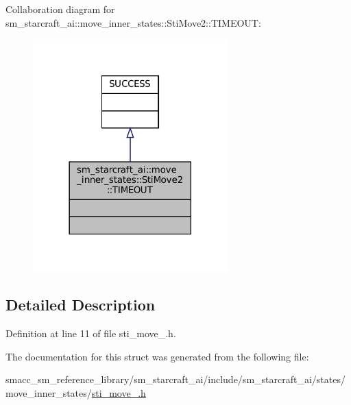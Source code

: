 Collaboration diagram for sm\+\_\+starcraft\+\_\+ai\+:\+:move\+\_\+inner\+\_\+states\+:\+:Sti\+Move2\+:\+:T\+I\+M\+E\+O\+UT\+:
\nopagebreak
\begin{figure}[H]
\begin{center}
\leavevmode
\includegraphics[width=213pt]{structsm__starcraft__ai_1_1move__inner__states_1_1StiMove2_1_1TIMEOUT__coll__graph}
\end{center}
\end{figure}


\subsection{Detailed Description}


Definition at line 11 of file sti\+\_\+move\+\_.\+h.



The documentation for this struct was generated from the following file\+:\begin{DoxyCompactItemize}
\item 
smacc\+\_\+sm\+\_\+reference\+\_\+library/sm\+\_\+starcraft\+\_\+ai/include/sm\+\_\+starcraft\+\_\+ai/states/move\+\_\+inner\+\_\+states/\hyperlink{sti__move__2_8h}{sti\+\_\+move\+\_.\+h}\end{DoxyCompactItemize}
